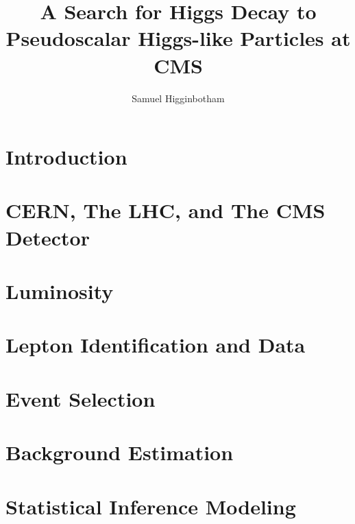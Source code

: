 \documentclass[phd,black]{PrincetonThesis}
\title{A Search for Higgs Decay to Pseudoscalar Higgs-like Particles at CMS}
\author{Samuel Higginbotham}
\begin{document}
\begin{frontmatter}
  \begin{thesisabstract}
    
  \end{thesisabstract}
  \begin{acknowledgements}
    
  \end{acknowledgements}
\end{frontmatter}
\graphicspath{{/mnt/c/Users/Sam Higginbotham/Dropbox/HAA/}{/mnt/c/Users/Sam Higginbotham/Dropbox/HAA/plots/}{/mnt/c/Users/Sam Higginbotham/Dropbox/HAA/paper/AN-20-208/}{/mnt/c/Users/Sam Higginbotham/Dropbox/MyPhD/figures}}



\chapter{Introduction}
\label{chap:Introduction}


\chapter{CERN, The LHC, and The CMS Detector}
\label{chap:cmsdet}


\chapter{Luminosity}
\label{chap:lumi}


\chapter{Lepton Identification and Data}
\label{chap:samples}


\chapter{Event Selection}
\label{chap:selection}


\chapter{Background Estimation}
\label{chap:background}


\chapter{Statistical Inference Modeling}
\label{chap:stat}


\end{document}
